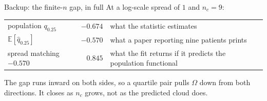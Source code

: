 \documentclass[10pt,aspectratio=169]{beamer}
\begin{document}
\begin{frame}[t]{Backup: the finite-$n$ gap, in full}
  At a log-scale spread of $1$ and $n_c=9$:
  \begin{center}\small
  \begin{tabularx}{0.92\textwidth}{@{}lrX@{}}
    \toprule
    population $q_{0.25}$ & $-0.674$ & what the statistic estimates \\
    $\mathbb{E}[\hat q_{0.25}]$ & $-0.570$ & what a paper reporting nine patients prints \\
    spread matching $-0.570$ & $0.845$ & what the fit returns if it predicts the population functional \\
    \bottomrule
  \end{tabularx}
  \end{center}
  \vfill
  The gap runs inward on both sides, so a quartile pair pulls $\Omega$ down from
  both directions. It closes as $n_c$ grows, not as the predicted cloud does.
\end{frame}
\end{document}
